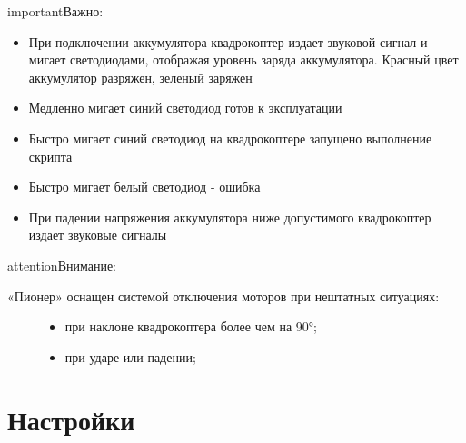 \documentclass[a4paper,10pt,russian]{sphinxmanual}
\begin{document}
\begin{sphinxadmonition}{important}{Важно:}\begin{itemize}
\item {} 
При подключении аккумулятора квадрокоптер издает звуковой сигнал и мигает светодиодами, отображая уровень заряда аккумулятора. Красный цвет \textendash{} аккумулятор разряжен, зеленый \textendash{} заряжен

\item {} 
Медленно мигает синий светодиод \textendash{} готов к эксплуатации

\item {} 
Быстро мигает синий светодиод \textendash{} на квадрокоптере запущено выполнение скрипта

\item {} 
Быстро мигает белый светодиод - ошибка

\item {} 
При падении напряжения аккумулятора ниже допустимого квадрокоптер издает звуковые сигналы

\end{itemize}
\end{sphinxadmonition}

\noindent{}

\begin{sphinxadmonition}{attention}{Внимание:}\begin{description}
\item[{«Пионер» оснащен системой отключения моторов при нештатных ситуациях:}] \leavevmode\begin{itemize}
\item {} 
при наклоне квадрокоптера более чем на 90°;

\item {} 
при ударе или падении;

\end{itemize}

\end{description}
\end{sphinxadmonition}


\chapter{Настройки}
\label{\detokenize{settings/settings_main:id1}}\label{\detokenize{settings/settings_main::doc}}
\end{document}
